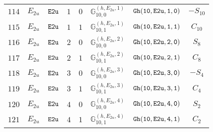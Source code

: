 \documentclass[fleqn,8pt]{jsarticle}
\begin{document}
\begin{table}[ht!]
\begin{center}
\begin{tabular}{cccccccc}
$ 114 $ & $ E_{2u} $ & $ {\tt E2u} $ & $ 1 $ & $ 0 $ & $ \mathbb{G}_{10,0}^{(h,E_{2u},1)} $ & $ {\tt Gh(10,E2u,1,0)} $ & $ - S_{10} $ \\
$ 115 $ & $ E_{2u} $ & $ {\tt E2u} $ & $ 1 $ & $ 1 $ & $ \mathbb{G}_{10,1}^{(h,E_{2u},1)} $ & $ {\tt Gh(10,E2u,1,1)} $ & $ C_{10} $ \\
$ 116 $ & $ E_{2u} $ & $ {\tt E2u} $ & $ 2 $ & $ 0 $ & $ \mathbb{G}_{10,0}^{(h,E_{2u},2)} $ & $ {\tt Gh(10,E2u,2,0)} $ & $ S_{8} $ \\
$ 117 $ & $ E_{2u} $ & $ {\tt E2u} $ & $ 2 $ & $ 1 $ & $ \mathbb{G}_{10,1}^{(h,E_{2u},2)} $ & $ {\tt Gh(10,E2u,2,1)} $ & $ C_{8} $ \\
$ 118 $ & $ E_{2u} $ & $ {\tt E2u} $ & $ 3 $ & $ 0 $ & $ \mathbb{G}_{10,0}^{(h,E_{2u},3)} $ & $ {\tt Gh(10,E2u,3,0)} $ & $ - S_{4} $ \\
$ 119 $ & $ E_{2u} $ & $ {\tt E2u} $ & $ 3 $ & $ 1 $ & $ \mathbb{G}_{10,1}^{(h,E_{2u},3)} $ & $ {\tt Gh(10,E2u,3,1)} $ & $ C_{4} $ \\
$ 120 $ & $ E_{2u} $ & $ {\tt E2u} $ & $ 4 $ & $ 0 $ & $ \mathbb{G}_{10,0}^{(h,E_{2u},4)} $ & $ {\tt Gh(10,E2u,4,0)} $ & $ S_{2} $ \\
$ 121 $ & $ E_{2u} $ & $ {\tt E2u} $ & $ 4 $ & $ 1 $ & $ \mathbb{G}_{10,1}^{(h,E_{2u},4)} $ & $ {\tt Gh(10,E2u,4,1)} $ & $ C_{2} $ \\
 \hline \hline
\end{tabular}
\end{center}
\end{table}
\end{document}
